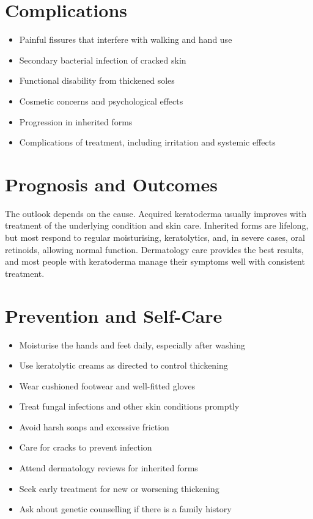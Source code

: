 \section*{Complications}
\begin{itemize}
    \item Painful fissures that interfere with walking and hand use
    \item Secondary bacterial infection of cracked skin
    \item Functional disability from thickened soles
    \item Cosmetic concerns and psychological effects
    \item Progression in inherited forms
    \item Complications of treatment, including irritation and systemic effects
\end{itemize}

\section*{Prognosis and Outcomes}
The outlook depends on the cause. Acquired keratoderma usually improves with treatment of the underlying condition and skin care. Inherited forms are lifelong, but most respond to regular moisturising, keratolytics, and, in severe cases, oral retinoids, allowing normal function. Dermatology care provides the best results, and most people with keratoderma manage their symptoms well with consistent treatment.

\section*{Prevention and Self-Care}
\begin{itemize}
    \item Moisturise the hands and feet daily, especially after washing
    \item Use keratolytic creams as directed to control thickening
    \item Wear cushioned footwear and well-fitted gloves
    \item Treat fungal infections and other skin conditions promptly
    \item Avoid harsh soaps and excessive friction
    \item Care for cracks to prevent infection
    \item Attend dermatology reviews for inherited forms
    \item Seek early treatment for new or worsening thickening
    \item Ask about genetic counselling if there is a family history
\end{itemize}

